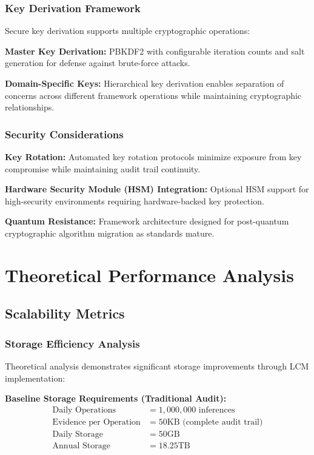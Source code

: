 \documentclass[12pt,a4paper]{article}
\begin{document}
\subsubsection{Key Derivation Framework}

Secure key derivation supports multiple cryptographic operations:

\textbf{Master Key Derivation:} PBKDF2 with configurable iteration counts and salt generation for defense against brute-force attacks.

\textbf{Domain-Specific Keys:} Hierarchical key derivation enables separation of concerns across different framework operations while maintaining cryptographic relationships.

\subsubsection{Security Considerations}

\textbf{Key Rotation:} Automated key rotation protocols minimize exposure from key compromise while maintaining audit trail continuity.

\textbf{Hardware Security Module (HSM) Integration:} Optional HSM support for high-security environments requiring hardware-backed key protection.

\textbf{Quantum Resistance:} Framework architecture designed for post-quantum cryptographic algorithm migration as standards mature.

\section{Theoretical Performance Analysis}

\subsection{Scalability Metrics}

\subsubsection{Storage Efficiency Analysis}

Theoretical analysis demonstrates significant storage improvements through LCM implementation:

\textbf{Baseline Storage Requirements (Traditional Audit):}
\begin{align}
\text{Daily Operations} &= 1,000,000 \text{ inferences} \\
\text{Evidence per Operation} &= 50\text{KB (complete audit trail)} \\
\text{Daily Storage} &= 50\text{GB} \\
\text{Annual Storage} &= 18.25\text{TB}
\end{align}
\end{document}
